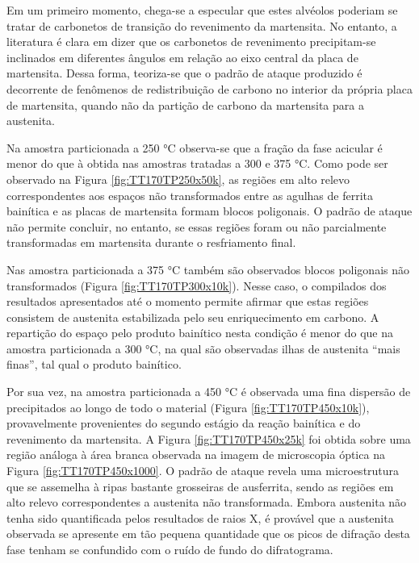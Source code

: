 Em um primeiro momento, chega-se a especular que estes alvéolos poderiam se tratar de carbonetos de transição do revenimento da martensita. No entanto, a literatura é clara em dizer que os carbonetos de revenimento precipitam-se inclinados em diferentes ângulos em relação ao eixo central da placa de martensita. %
Dessa forma, teoriza-se que o padrão de ataque produzido é decorrente de fenômenos de redistribuição de carbono no interior da própria placa de martensita, quando não da partição de carbono da martensita para a austenita.

Na amostra particionada a 250 °C observa-se que a fração da fase acicular é menor do que à obtida nas amostras tratadas a 300 e 375 °C. Como pode ser observado na Figura \ref{fig:TT170TP250x50k}, as regiões em alto relevo correspondentes aos espaços não transformados entre as agulhas de ferrita bainítica e as placas de martensita formam blocos poligonais. O padrão de ataque não permite concluir, no entanto, se essas regiões foram ou não parcialmente transformadas em martensita durante o resfriamento final.

Nas amostra particionada a 375 °C também são observados blocos poligonais não transformados (Figura \ref{fig:TT170TP300x10k}). Nesse caso, o compilados dos resultados apresentados até o momento permite afirmar que estas regiões consistem de austenita estabilizada pelo seu enriquecimento em carbono. A repartição do espaço pelo produto bainítico nesta condição é menor do que na amostra particionada a 300 °C, na qual são observadas ilhas de austenita ``mais finas'', tal qual o produto bainítico.

Por sua vez, na amostra particionada a 450 °C é observada uma fina dispersão de precipitados ao longo de todo o material (Figura \ref{fig:TT170TP450x10k}), provavelmente provenientes do segundo estágio da reação bainítica e do revenimento da martensita. A Figura \ref{fig:TT170TP450x25k} foi obtida sobre uma região análoga à área branca observada na imagem de microscopia óptica na Figura \ref{fig:TT170TP450x1000}. O padrão de ataque revela uma microestrutura que se assemelha à ripas bastante grosseiras de ausferrita, sendo as regiões em alto relevo correspondentes a austenita não transformada. Embora austenita não tenha sido quantificada pelos resultados de raios X, é provável que a austenita observada se apresente em tão pequena quantidade que os picos de difração desta fase tenham se confundido com o ruído de fundo do difratograma.